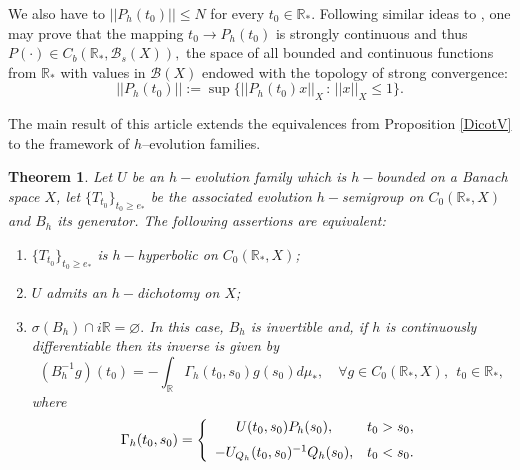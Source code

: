 \documentclass[10pt]{amsart}
\newtheorem{theorem}{Theorem}
\numberwithin{equation}{section}
\begin{document}
We also have to $||P_h(t_0)|| \le N$ for every $t_0 \in \mathbb{R}_*.$ Following similar ideas to \cite[Lemma 4.2]{VRS}, one may prove that the mapping $t_0 \to P_h(t_0)$ is strongly continuous and thus $P(\cdot) \in C_b(\mathbb{R}_*, \mathcal{B}_{s}(X)),$ the space of all bounded and continuous functions from $\mathbb{R}_*$ with values in $\mathcal{B}(X)$ endowed with the topology of strong convergence:
$$
||P_h(t_0)||:= \sup\{ ||P_h(t_0)x||_X \, : \, ||x||_X \le 1\}.
$$

The main result of this article extends the equivalences from Proposition \ref{DicotV} to the framework
of $h$--evolution families.

\begin{theorem}\label{h-dichotomy}
   Let $U$ be an  $h-$evolution family which is $h-$bounded on a Banach space $X$, let $\{T_{t_0}\}_{t_0 \ge e_* }$ be the associated evolution $h-$semigroup on  $C_0(\mathbb{R}_*,X)$ and $B_h$ its generator. The following assertions are equivalent:

\medskip


\begin{enumerate}
    

\item $\{ T_{t_0}\}_{t_0 \ge e_* }$ is $h-$hyperbolic on $C_0(\mathbb{R}_*,X)$;

\item $U$ admits an $h-$dichotomy on $X$;

\item  $\sigma(B_h) \cap i\mathbb{R} = \varnothing.$ In this case, $B_h$ is invertible and, if $h$ is continuously differentiable then  its inverse is given by 
\begin{equation}\label{InversaB_h}
(B_h^{-1}g)(t_0) = - \int_{\mathbb{R}} \Gamma_h(t_0,s_0) g(s_0) d\mu_*, \quad \forall g \in C_0(\mathbb{R}_*,X), \ \ t_0 \in \mathbb{R}_*,
\end{equation}
where 
$$
\Gamma_h(t_0,s_0) = \left\{ 
\begin{array}{cl}
\medskip
   U(t_0,s_0)P_h(s_0),  &  t_0 > s_0, \\
    - U_{Q_h}(t_0,s_0)^{-1} Q_h(s_0) , & t_0 < s_0.
\end{array}
\right.
$$



\end{enumerate}
   
   \end{theorem}
\end{document}
